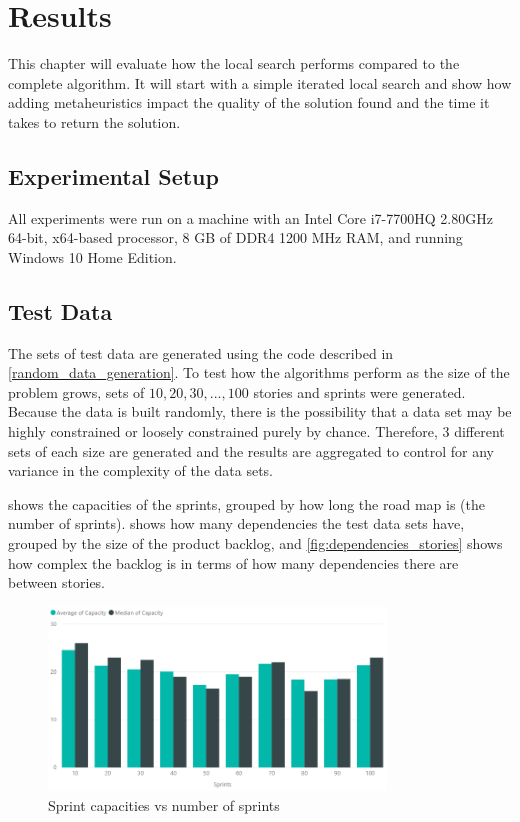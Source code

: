 
\chapter{Results}
\label{ChapterResults}

This chapter will evaluate how the local search performs compared to the complete algorithm. It will start with a simple iterated local search and show how adding metaheuristics impact the quality of the solution found and the time it takes to return the solution.

\section{Experimental Setup}
All experiments were run on a machine with an Intel Core i7-7700HQ 2.80GHz 64-bit, x64-based processor, 8 GB of DDR4 1200 MHz RAM, and running Windows 10 Home Edition.

\section{Test Data}
The sets of test data are generated using the code described in \cref{random_data_generation}. To test how the algorithms perform as the size of the problem grows, sets of $10, 20, 30, ..., 100$ stories and sprints were generated. Because the data is built randomly, there is the possibility that a data set may be highly constrained or loosely constrained purely by chance. Therefore, 3 different sets of each size are generated and the results are aggregated to control for any variance in the complexity of the data sets.

 shows the capacities of the sprints, grouped by how long the road map is (the number of sprints).  shows how many dependencies the test data sets have, grouped by the size of the product backlog, and \cref{fig:dependencies_stories} shows how complex the backlog is in terms of how many dependencies there are between stories.

\begin{figure}[h!]
    \centering
    \includegraphics[width=0.8\textwidth]{Figures/TestData/sprints.png}
    \caption{Sprint capacities vs number of sprints}
    \label{fig:sprints}
\end{figure}

